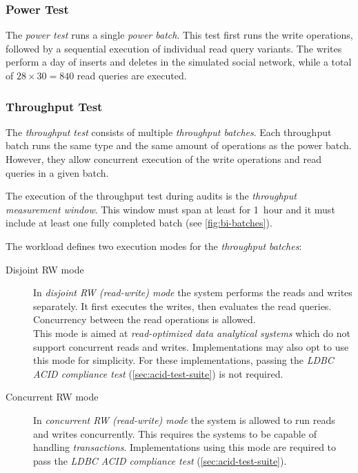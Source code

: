 \subsubsection{Power Test}
\label{sec:power-test}

The \emph{power test} runs a single \emph{power batch}. This test first runs the write operations, followed by a sequential execution of individual read query variants.
The writes perform a day of inserts and deletes in the simulated social network,
while a total of $28 \times 30 = 840$ read queries are executed.

\subsubsection{Throughput Test}
\label{sec:throughput-test}

The \emph{throughput test} consists of multiple \emph{throughput batches}.
Each throughput batch runs the same type and the same amount of operations as the power batch.
However, they allow concurrent execution of the write operations and read queries in a given batch.

The execution of the throughput test during audits is the \emph{throughput measurement window}.
This window must span at least for 1~hour and
it must include at least one fully completed batch (see \autoref{fig:bi-batches}).

The workload defines two execution modes for the \emph{throughput batches}:

\begin{description}
    \item[Disjoint RW mode]
    In \emph{disjoint RW (read-write) mode} the system performs the reads and writes separately. It first executes the writes, then evaluates the read queries. Concurrency between the read operations is allowed.\\
    This mode is aimed at \emph{read-optimized data analytical systems} which do not support concurrent reads and writes. Implementations may also opt to use this mode for simplicity. For these implementations, passing the \emph{LDBC ACID compliance test} (\autoref{sec:acid-test-suite}) is not required.

    \item[Concurrent RW mode]
    In \emph{concurrent RW (read-write) mode} the system is allowed to run reads and writes concurrently. This requires the systems to be capable of handling \emph{transactions}. Implementations using this mode are required to pass the \emph{LDBC ACID compliance test} (\autoref{sec:acid-test-suite}).
\end{description}

